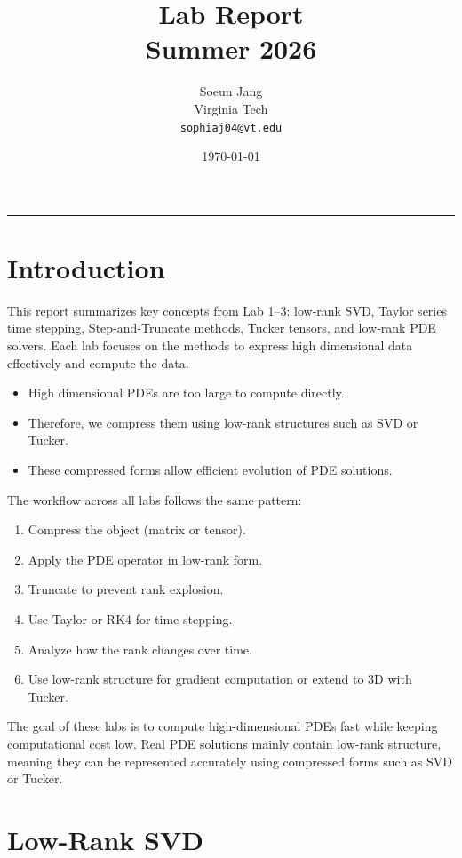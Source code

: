 \documentclass{article}
\title{
    \vspace{-1cm}
    \textbf{Lab Report}\\
    \vspace{0.2cm}
    Summer 2026
}
\author{
    Soeun Jang \\
    Virginia Tech \\
    \texttt{sophiaj04@vt.edu}
}
\date{\today}
\makeatletter
\renewcommand{\maketitle}{
  \begin{center}
    {\LARGE \bfseries \@title \par}
    \vspace{0.5em}
    \rule{0.8\textwidth}{0.4pt}\par
    \vspace{0.5em}
    {\large \@author \par}
    \vspace{0.5em}
    {\@date}
  \end{center}
}
\makeatother
\begin{document}
\maketitle
\newpage   

\tableofcontents
\newpage   

\section*{Introduction}

This report summarizes key concepts from Lab 1–3: low‑rank SVD, Taylor series time stepping, Step‑and‑Truncate methods, Tucker tensors, and low‑rank PDE solvers. Each lab focuses on the methods to express high dimensional data effectively and compute the data.

\begin{itemize}
    \item High dimensional PDEs are too large to compute directly.
    \item Therefore, we compress them using low-rank structures such as SVD or Tucker.
    \item These compressed forms allow efficient evolution of PDE solutions.
\end{itemize}

The workflow across all labs follows the same pattern:

\begin{enumerate}
    \item Compress the object (matrix or tensor).
    \item Apply the PDE operator in low-rank form.
    \item Truncate to prevent rank explosion.
    \item Use Taylor or RK4 for time stepping.
    \item Analyze how the rank changes over time.
    \item Use low-rank structure for gradient computation or extend to 3D with Tucker.
\end{enumerate}

The goal of these labs is to compute high-dimensional PDEs fast while keeping computational cost low. Real PDE solutions mainly contain low-rank structure, meaning they can be represented accurately using compressed forms such as SVD or Tucker.

\section*{Low-Rank SVD}
\end{document}
